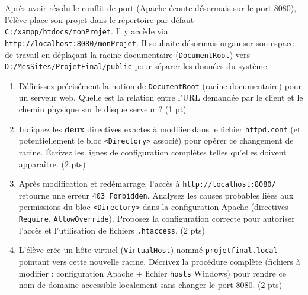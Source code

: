 \documentclass[11pt]{article}
\begin{document}
\begin{exercice}
Après avoir résolu le conflit de port (Apache écoute désormais sur le port 8080), l'élève place son projet dans le répertoire par défaut \texttt{C:/xampp/htdocs/monProjet}. Il y accède via \texttt{http://localhost:8080/monProjet}. Il souhaite désormais organiser son espace de travail en déplaçant la racine documentaire (\texttt{DocumentRoot}) vers \texttt{D:/MesSites/ProjetFinal/public} pour séparer les données du système.

\begin{enumerate}
    \item Définissez précisément la notion de \texttt{DocumentRoot} (racine documentaire) pour un serveur web. Quelle est la relation entre l'URL demandée par le client et le chemin physique sur le disque serveur ? (1 pt)
    \item Indiquez les \textbf{deux} directives exactes à modifier dans le fichier \texttt{httpd.conf} (et potentiellement le bloc \texttt{<Directory>} associé) pour opérer ce changement de racine. Écrivez les lignes de configuration complètes telles qu'elles doivent apparaître. (2 pts)
    \item Après modification et redémarrage, l'accès à \texttt{http://localhost:8080/} retourne une erreur \texttt{403 Forbidden}. Analysez les causes probables liées aux permissions du bloc \texttt{<Directory>} dans la configuration Apache (directives \texttt{Require}, \texttt{AllowOverride}). Proposez la configuration correcte pour autoriser l'accès et l'utilisation de fichiers \texttt{.htaccess}. (2 pts)
    \item L'élève crée un hôte virtuel (\texttt{VirtualHost}) nommé \texttt{projetfinal.local} pointant vers cette nouvelle racine. Décrivez la procédure complète (fichiers à modifier : configuration Apache + fichier \texttt{hosts} Windows) pour rendre ce nom de domaine accessible localement sans changer le port 8080. (2 pts)
\end{enumerate}
\end{exercice}
\end{document}
